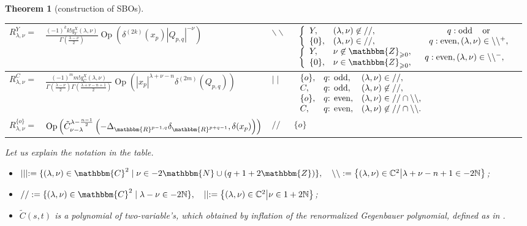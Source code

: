 \documentclass[12pt]{article} %
\newcommand{\assign}{:=}
\newcommand{\nin}{\not\in}
\newcommand{\tmop}[1]{\ensuremath{\operatorname{#1}}}
\newtheorem{theorem}{Theorem}
\theoremstyle{definition}
\theoremstyle{exampstyle} \newtheorem{examp}[theorem]{Theorem}
\renewcommand{\Q}{Q_{p,q}}
\newcommand{\teven}{\mbox{\textrm{: even}}}
\newcommand{\todd}{\mbox{\textrm{: odd}}}
\begin{document}
\begin{theorem}[construction of SBOs]
\begin{tabular}{@{}|@{}l@{}|@{}l@{}|l@{}|@{}l@{}|}
  \hline
  $R_{\lambda, \nu}^Y =$ & $\frac{(-1)^k k! q_Y^X (\lambda, \nu)}{\Gamma \left( \frac{\lambda - \nu}{2}
  \right) }{\tmop{Op} \left( \delta^{(2k)}(x_p)
  | \Q |^{- \nu}  \right)}$ & $
  \backslash\backslash$ & {
$ \begin{array}{ll}
  \left\{ \begin{array}{ll}
    Y, & (\lambda, \nu) \nin / /,\\
    \{ 0 \}, & (\lambda, \nu) \in / /,
  \end{array} \right. & \begin{array}{c}
    q : \tmop{odd} \quad \tmop{or}\\
    q : \tmop{even}, (\lambda, \nu) \in \backslash\backslash^+,
  \end{array}\\
  \left\{ \begin{array}{ll}
    Y, & \nu \nin \mathbbm{Z}_{\geqslant 0},\\
    \{ 0 \}, & \nu \in \mathbbm{Z}_{\geqslant 0},
  \end{array} \right. & q : \tmop{even}, (\lambda, \nu) \in
  \backslash\backslash^-,
\end{array} $
  }\\
  \hline
  $R_{\lambda, \nu}^C =$ & $\frac{(-1)^m m! q_C^X (\lambda, \nu)}{\Gamma \left( \frac{\lambda - \nu}{2}
  \right) \Gamma \left( \frac{\lambda + \nu - n + 1}{2} \right) }{\tmop{Op} \left( | x_p |^{\lambda + \nu - n}\delta^{(2m)}\left( \Q \right)
    \right)}$ & $ \mid \mid$ &
  $\left. \begin{array}{lll}
	  \{ o \}, &q\todd, & (\lambda, \nu) \in / /,\\
    C, & q\todd, & (\lambda, \nu) \nin / /,\\
    \{ o \}, & q\teven , & (\lambda, \nu) \in / / \cap
    \backslash\backslash,\\
    C, & q\teven, & (\lambda, \nu) \nin / / \cap
    \backslash\backslash.
  \end{array} \right.$\\
  \hline
  $R_{\lambda, \nu}^{\{ o \}} =$ & 
  $\tmop{Op} \left( \tilde{C}_{\nu -
  \lambda}^{\lambda - \frac{n - 1}{2}} \left(-\Delta_{\mathbbm{R}^{p - 1, q}}
  \delta_{\mathbbm{R}^{p + q - 1}}, \delta (x_p)\right) \right)
  $ & $
  / /$ & $\{ o \}$\\
  \hline
\end{tabular}
Let us explain the notation in the table.
\begin{itemize}
	\item $\mid \mid \mid \assign \{ (\lambda, \nu) \in \mathbbm{C}^2 \mid \nu \in
	- 2\mathbbm{N} \cup (q + 1 + 2\mathbbm{Z}) \},\quad \backslash\backslash:=\mysetn{(\lambda,\nu)\in\C^2}{\lambda+\nu-n+1\in-2\N}$;
\item $/ / \assign
\{ (\lambda, \nu) \in \mathbbm{C}^2 \mid \lambda - \nu \in
-2\N \},\quad \mid\mid:=\mysetn{(\lambda,\nu)\in\C^2}{\nu\in1+2\N}$;
\item $\tilde{C}(s,t)$ is a polynomial of two-variable's, which obtained by inflation of the renormalized Gegenbauer polynomial, defined as in \cite[(16.3)]{kobayashi2015symmetry}.
\end{itemize}
\end{theorem}
\end{document}
